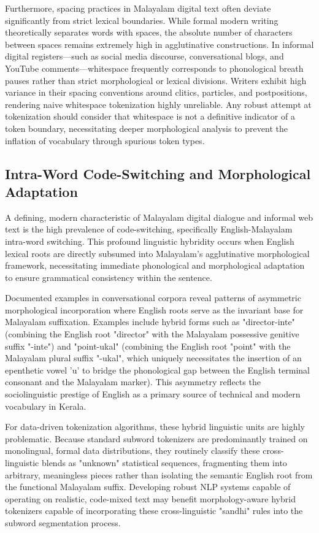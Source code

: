 \documentclass[12pt]{article}
\begin{document}
Furthermore, spacing practices in Malayalam digital text often deviate significantly from strict lexical boundaries. While formal modern writing theoretically separates words with spaces, the absolute number of characters between spaces remains extremely high in agglutinative constructions. In informal digital registers—such as social media discourse, conversational blogs, and YouTube comments—whitespace frequently corresponds to phonological breath pauses rather than strict morphological or lexical divisions. Writers exhibit high variance in their spacing conventions around clitics, particles, and postpositions, rendering naive whitespace tokenization highly unreliable. Any robust attempt at tokenization should consider that whitespace is not a definitive indicator of a token boundary, necessitating deeper morphological analysis to prevent the inflation of vocabulary through spurious token types. 

\subsection{Intra-Word Code-Switching and Morphological Adaptation }

A defining, modern characteristic of Malayalam digital dialogue and informal web text is the high prevalence of code-switching, specifically English-Malayalam intra-word switching. This profound linguistic hybridity occurs when English lexical roots are directly subsumed into Malayalam's agglutinative morphological framework, necessitating immediate phonological and morphological adaptation to ensure grammatical consistency within the sentence. 

Documented examples in conversational corpora reveal patterns of asymmetric morphological incorporation where English roots serve as the invariant base for Malayalam suffixation. Examples include hybrid forms such as "director-inte" (combining the English root "director" with the Malayalam possessive genitive suffix "-inte") and "point-ukal" (combining the English root "point" with the Malayalam plural suffix "-ukal", which uniquely necessitates the insertion of an epenthetic vowel 'u' to bridge the phonological gap between the English terminal consonant and the Malayalam marker). This asymmetry reflects the sociolinguistic prestige of English as a primary source of technical and modern vocabulary in Kerala. 

For data-driven tokenization algorithms, these hybrid linguistic units are highly problematic. Because standard subword tokenizers are predominantly trained on monolingual, formal data distributions, they routinely classify these cross-linguistic blends as "unknown" statistical sequences, fragmenting them into arbitrary, meaningless pieces rather than isolating the semantic English root from the functional Malayalam suffix. Developing robust NLP systems capable of operating on realistic, code-mixed text may benefit morphology-aware hybrid tokenizers capable of incorporating these cross-linguistic "sandhi" rules into the subword segmentation process. 
\end{document}

